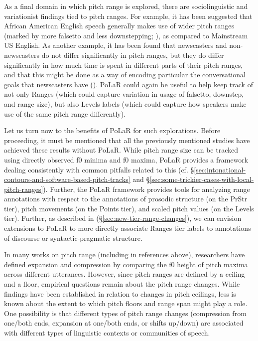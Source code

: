 \documentclass[11pt, twoside]{memoir}
\begin{document}
As a final domain in which pitch range is explored, there are sociolinguistic and variationist findings tied to pitch ranges. For example, it has been suggested that African American English speech generally makes use of wider pitch ranges (marked by more falsetto and less downstepping; \citealt{wolfram-02, thomas07}), as compared to Mainstream US English. As another example, it has been found that newscasters and non-newscasters do not differ significantly in pitch ranges, but they do differ significantly in how much time is spent in different parts of their pitch ranges, and that this might be done as a way of encoding particular the conversational goals that newscasters have (\citealt{gasser-19}). PoLaR could again be useful to help keep track of not only Ranges (which could capture variation in usage of falsetto, downstep, and range size), but also Levels labels (which could capture how speakers make use of the same pitch range differently).

Let us turn now to the benefits of PoLaR for such explorations. Before proceeding, it must be mentioned that all the previously mentioned studies have achieved these results without PoLaR. While pitch range size can be tracked using directly observed f0 minima and f0 maxima, PoLaR provides a framework  dealing consistently with common pitfalls related to this (cf. §\ref{sec:intonational-contours-and-software-based-pitch-tracks} and §\ref{sec:some-trickier-cases-with-local-pitch-ranges}). Further, the PoLaR framework provides tools for analyzing range annotations with respect to the annotations of prosodic structure (on the PrStr tier), pitch movements (on the Points tier), and scaled pitch values (on the Levels tier). Further, as described in (§\ref{sec:new-tier-range-changes}), we can envision extensions to PoLaR to more directly associate Ranges tier labels to annotations of discourse or syntactic-pragmatic structure. 
\newline

In many works on pitch range (including in references above), researchers have defined expansion and compression by comparing the f0 height of pitch maxima across different utterances. However, since pitch ranges are defined by a ceiling and a floor, empirical questions remain about the pitch range changes. While findings have been established in relation to changes in pitch ceilings, less is known about the extent to which pitch floors and range span might play a role. One possibility is that different types of pitch range changes (compression from one\slash both ends, expansion at one\slash both ends, or shifts up\slash down) are associated with different types of linguistic contexts or communities of speech.
\end{document}

